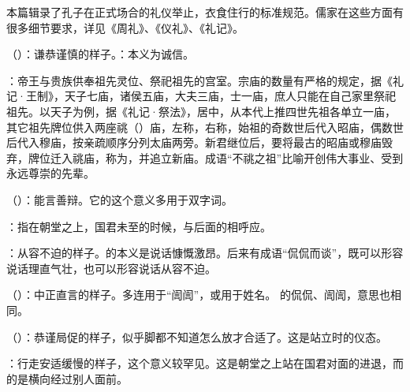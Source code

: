 本篇辑录了孔子在正式场合的礼仪举止，衣食住行的标准规范。儒家在这些方面有很多细节要求，详见《周礼》、《仪礼》、《礼记》。%

\bigskip

{
\item {}（）：谦恭谨慎的样子。：本义为诚信。
\item {}：帝王与贵族供奉祖先灵位、祭祀祖先的宫室。宗庙的数量有严格的规定，据《礼记·王制》，天子七庙，诸侯五庙，大夫三庙，士一庙，庶人只能在自己家里祭祀祖先。以天子为例，据《礼记·祭法》，居中，从本代上推四世先祖各单立一庙，其它祖先牌位供入两座祧（）庙，左称，右称，始祖的奇数世后代入昭庙，偶数世后代入穆庙，按亲疏顺序分列太庙两旁。新君继位后，要将最古的昭庙或穆庙毁弃，牌位迁入祧庙，称为，并追立新庙。成语“不祧之祖”比喻开创伟大事业、受到永远尊崇的先辈。 %
\item {}（）：能言善辩。它的这个意义多用于双字词。
}
{}


{
\item {}：指在朝堂之上，国君未至的时候，与后面的相呼应。

\item {}：从容不迫的样子。的本义是说话慷慨激昂。后来有成语“侃侃而谈”，既可以形容说话理直气壮，也可以形容说话从容不迫。

（）：中正直言的样子。多连用于“訚訚”，或用于姓名。 的侃侃、訚訚，意思也相同。

\item {}（）：恭谨局促的样子，似乎脚都不知道怎么放才合适了。这是站立时的仪态。

：行走安适缓慢的样子，这个意义较罕见。这是朝堂之上站在国君对面的进退，而  的是横向经过别人面前。
}
{}  %


